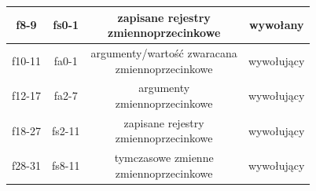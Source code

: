 \documentclass[11pt,a4paper]{article}
\begin{document}
\begin{center}
{\begin{tabular}{|c|c|c|c|}
			f8-9 & fs0-1 & \makecell{zapisane rejestry \\ zmiennoprzecinkowe} & wywołany \\
			\hline
			f10-11 & fa0-1 & \makecell{argumenty/wartość zwaracana \\ zmiennoprzecinkowe} & wywołujący \\
			\hline
			f12-17 & fa2-7 & \makecell{argumenty \\ zmiennoprzecinkowe} & wywołujący \\
			\hline
			f18-27 & fs2-11 & \makecell{zapisane rejestry\\ zmiennoprzecinkowe} & wywołujący \\
			\hline
			f28-31 & fs8-11 & \makecell {tymczasowe zmienne \\zmiennoprzecinkowe} & wywołujący \\
			\hline
			\end{tabular}}
		\end{center}
\end{document}
